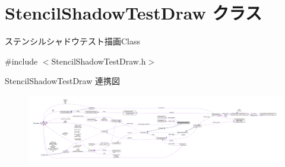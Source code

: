 \hypertarget{class_stencil_shadow_test_draw}{}\section{Stencil\+Shadow\+Test\+Draw クラス}
\label{class_stencil_shadow_test_draw}


ステンシルシャドウテスト描画\+Class  




{\ttfamily \#include $<$Stencil\+Shadow\+Test\+Draw.\+h$>$}



Stencil\+Shadow\+Test\+Draw 連携図\nopagebreak
\begin{figure}[H]
\begin{center}
\leavevmode
\includegraphics[width=350pt]{class_stencil_shadow_test_draw__coll__graph}
\end{center}
\end{figure}

